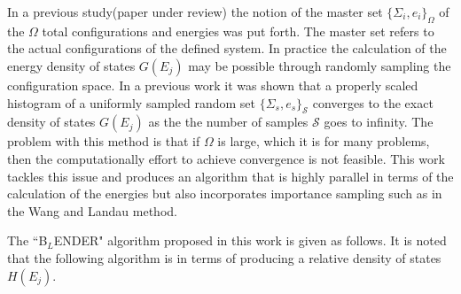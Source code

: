 \documentclass[aps,prl,reprint,superscriptaddress,showkeys]{revtex4-1}
\begin{document}
  In a previous study(paper under review) the notion of the master set $\{ \Sigma_i, e_i \}_\Omega $ of the $\Omega$ total configurations and energies was put forth. The master set refers to the actual configurations of the defined system. In practice the calculation of the energy density of states $G(E_j)$  may  be possible through randomly sampling the configuration space.  In a previous work it was shown that a properly scaled histogram of a uniformly sampled random set $\{ \Sigma_s, e_s \}_\mathcal{S}$ converges to the exact density of states $G(E_j)$ as the the number of samples $\mathcal{S}$ goes to infinity. The problem with this method is that if $\Omega$ is large, which it is for many problems,  then the computationally effort to achieve convergence is not feasible.  This work tackles this issue and produces an algorithm that is highly parallel in terms of the calculation of the energies  but also incorporates importance sampling such as in the Wang and Landau method.
   
The ``B$_{L}$ENDER" algorithm proposed in this work  is given as follows. It is noted that the following algorithm is in terms of producing a relative density of states $H(E_j)$. 
\end{document}
